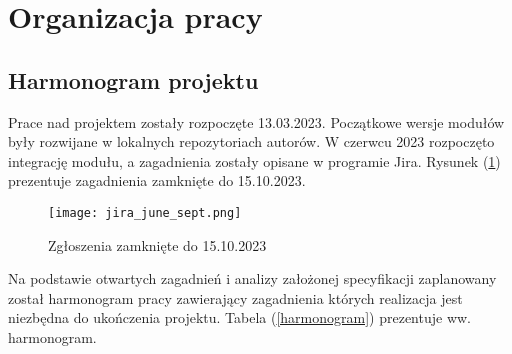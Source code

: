\section{Organizacja pracy}
\subsection{Harmonogram projektu}

Prace nad projektem zostały rozpoczęte 13.03.2023. Początkowe wersje modułów były rozwijane w lokalnych repozytoriach autorów. W czerwcu 2023 rozpoczęto integrację modułu, a zagadnienia zostały opisane w programie Jira. Rysunek (\ref{zamkniete_jira}) prezentuje zagadnienia zamknięte do 15.10.2023.

\begin{figure}[!h]
\centering
\texttt{[image: jira\_june\_sept.png]}
\caption{Zgłoszenia zamknięte do 15.10.2023}
\label{zamkniete_jira}
\end{figure}

Na podstawie otwartych zagadnień i analizy założonej specyfikacji zaplanowany został harmonogram pracy zawierający zagadnienia których realizacja jest niezbędna do ukończenia projektu. Tabela (\ref{harmonogram}) prezentuje ww. harmonogram. 

